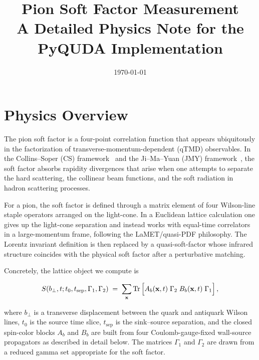\documentclass[11pt,a4paper]{article}
\begin{document}
\title{\textbf{Pion Soft Factor Measurement}\\[4pt]
\large A Detailed Physics Note for the PyQUDA Implementation}
\author{}
\date{\today}
\maketitle
\thispagestyle{fancy}

\section{Physics Overview}

The pion soft factor is a four-point correlation function that appears ubiquitously
in the factorization of transverse-momentum-dependent (qTMD) observables.
In the Collins--Soper (CS) framework~\cite{Collins:1981uk,Collins:1984kg} and the
Ji--Ma--Yuan (JMY) framework~\cite{Ji:2004wu,Ji:2019ewn}, the soft factor absorbs
rapidity divergences that arise when one attempts to separate the hard scattering,
the collinear beam functions, and the soft radiation in hadron scattering processes.

For a pion, the soft factor is defined through a matrix element of four Wilson-line
staple operators arranged on the light-cone.  In a Euclidean lattice calculation one
gives up the light-cone separation and instead works with equal-time correlators in
a large-momentum frame, following the LaMET/quasi-PDF philosophy.  The Lorentz
invariant definition is then replaced by a quasi-soft-factor whose infrared
structure coincides with the physical soft factor after a perturbative matching.

Concretely, the lattice object we compute is

\begin{equation}\label{eq:soft_def}
S(b_{\perp}, t; t_{0}, t_{\mathrm{sep}}, \Gamma_{1}, \Gamma_{2})
 \;=\;
\sum_{\mathbf{x}}
\Tr\Big[
  A_{b}(\mathbf{x}, t)\;\Gamma_{2}\;B_{b}(\mathbf{x}, t)\;\Gamma_{1}
\Big]\, ,
\end{equation}

where $b_{\perp}$ is a transverse displacement between the quark and antiquark
Wilson lines, $t_{0}$ is the source time slice, $t_{\mathrm{sep}}$ is the sink--source
separation, and the closed spin-color blocks $A_{b}$ and $B_{b}$ are built from four
Coulomb-gauge-fixed wall-source propagators as described in detail below.  The
matrices $\Gamma_{1}$ and $\Gamma_{2}$ are drawn from a reduced gamma set appropriate
for the soft factor.
\end{document}
